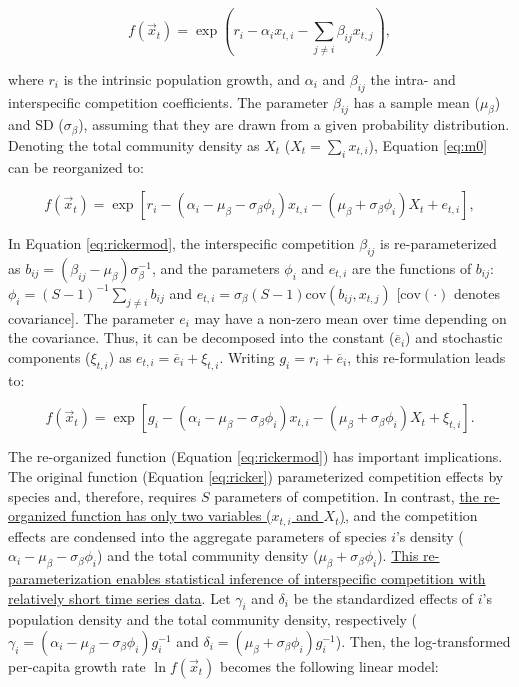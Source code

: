 \documentclass[12pt, class=article, crop=false]{standalone}
\begin{document}
\begin{equation}
\label{eq:ricker}
f(\overset{\rightarrow}{x}_{t}) = \exp(r_i - \alpha_i x_{t,i} - \sum_{j \ne i} \beta_{ij} x_{t,j}),
\end{equation}

where $r_i$ is the intrinsic population growth, and $\alpha_{i}$ and $\beta_{ij}$ the intra- and interspecific competition coefficients.
The parameter $\beta_{ij}$ has a sample mean ($\mu_{\beta}$) and SD ($\sigma_{\beta}$), assuming that they are drawn from a given probability distribution. 
Denoting the total community density as $X_t$ ($X_t = \sum_i x_{t,i}$), Equation \ref{eq:m0} can be reorganized to:

\begin{equation}
\label{eq:rickermod0}
f(\overset{\rightarrow}{x}_{t}) = \exp\left[r_i - (\alpha_i - \mu_{\beta} - \sigma_{\beta} \phi_i) x_{t,i} - (\mu_{\beta} +  \sigma_{\beta} \phi_i) X_t + e_{t,i} \right],
\end{equation}

In Equation \ref{eq:rickermod}, the interspecific competition $\beta_{ij}$ is re-parameterized as $b_{ij} = (\beta_{ij} - \mu_{\beta}) \sigma_{\beta}^{-1}$, and the parameters $\phi_{i}$ and $e_{t,i}$ are the functions of $b_{ij}$: $\phi_i = (S-1)^{-1}\sum_{j \ne i} b_{ij}$ and $e_{t,i} = \sigma_{\beta} (S - 1) \mbox{cov}(b_{ij}, x_{t,j})$ [$\mbox{cov}(\cdot)$ denotes covariance].
The parameter $e_i$ may have a non-zero mean over time depending on the covariance.
Thus, it can be decomposed into the constant ($\overline{e}_i$) and stochastic components ($\xi_{t,i}$) as $e_{t,i} = \overline{e}_i + \xi_{t,i}$.
Writing $g_{i} = r_i + \overline{e}_i$, this re-formulation leads to:

\begin{equation}
\label{eq:rickermod}
    f(\overset{\rightarrow}{x}_{t}) = \exp\left[g_{i} - (\alpha_i - \mu_{\beta} - \sigma_{\beta} \phi_i) x_{t,i} - (\mu_{\beta} +  \sigma_{\beta} \phi_i) X_t + \xi_{t,i} \right].
\end{equation}

The re-organized function (Equation \ref{eq:rickermod}) has important implications. 
The original function (Equation \ref{eq:ricker}) parameterized competition effects by species and, therefore, requires $S$ parameters of competition.
In contrast, \ul{the re-organized function has only two variables ($x_{t,i}$ and $X_t$)}, and the competition effects are condensed into the aggregate parameters of species $i$'s density ($\alpha_i - \mu_{\beta} - \sigma_{\beta} \phi_i$) and the total community density ($\mu_{\beta} + \sigma_{\beta} \phi_i$).
\ul{This re-parameterization enables statistical inference of interspecific competition with relatively short time series data}.
Let $\gamma_i$ and $\delta_i$ be the standardized effects of $i$'s population density and the total community density, respectively ($\gamma_i = (\alpha_i - \mu_{\beta} - \sigma_{\beta} \phi_i)g_i^{-1}$ and $\delta_i = (\mu_{\beta} + \sigma_{\beta} \phi_i)g_i^{-1}$).
Then, the log-transformed per-capita growth rate $\ln f(\overset{\rightarrow}{x}_{t})$ becomes the following linear model:
\end{document}
